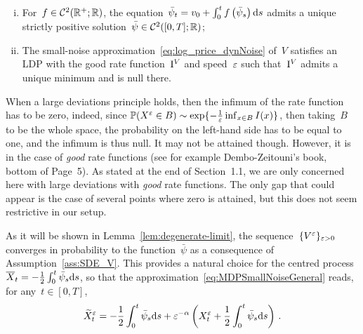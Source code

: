 \begin{assumption}\label{ass:SDE_V}\ 
\begin{enumerate}[i)]
    \item For~$f\in \mathcal{C}^2(\mathbb{R}^{+}; \mathbb{R})$, 
    the equation~$\bar\psi_t = v_0 + \int_0^t f\left(\bar\psi_s\right)\mathrm{d} s$ admits a unique strictly positive solution~$\bar\psi\in\mathcal{C}^2([0,T]; \mathbb{R})$;
    \item The small-noise approximation~\eqref{eq:log_price_dynNoise} of~$V$ satisfies an LDP with the good rate function~$\mathrm{I}^{V}$ and speed~$\varepsilon$ such that~$\mathrm{I}^{V}$ admits a unique minimum and is null there.
\end{enumerate}
\end{assumption}
\begin{remark}
When a large deviations principle holds,
then the infimum of the rate function has to be zero, indeed, since 
$\mathbb{P}(X^\varepsilon \in B)\sim \exp\{-\frac{1}{\varepsilon}\inf_{x\in B} I(x)\}$,
then taking~$B$ to be the whole space,  
the probability on the left-hand side has to be equal to one, and the infimum is thus null. 
It may not be attained though. 
However, it is in the case of \emph{good} rate functions (see for example Dembo-Zeitouni's book, bottom of Page~5). 
As stated at the end of Section~1.1, we are only concerned here with large deviations with \emph{good} rate functions.
The only gap that could appear is the case of several points where zero is attained,
but this does not seem restrictive in our setup.
\end{remark}
As it will be shown in Lemma~\ref{lem:degenerate-limit}, 
the sequence~$\{V^\varepsilon\}_{\varepsilon>0}$ converges in probability to the function~$\bar\psi$ as a consequence of Assumption~\ref{ass:SDE_V}. 
This provides a natural choice for the centred process 
${\overline{X}_t = -\frac{1}{2}\int_0^t\bar\psi_s\mathrm{d} s}$,
so that the approximation~\eqref{eq:MDPSmallNoiseGeneral}
reads, for any~$t\in [0,T]$,
\begin{equation}\label{eq:MDPSmallNoiseX}
\widetilde{X}^\varepsilon_t = -\frac{1}{2} \int_0^t\bar\psi_s \mathrm{d} s + \varepsilon^{-\alpha}\left(X^{\varepsilon}_t + \frac{1}{2} \int_0^t\bar\psi_s \mathrm{d} s\right)\,.
\end{equation}

